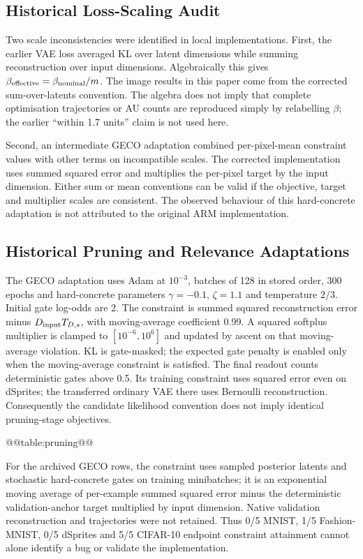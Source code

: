 \subsection{Historical Loss-Scaling Audit}\label{app:scaling}
Two scale inconsistencies were identified in local implementations.
First, the earlier VAE loss averaged KL over latent dimensions while
summing reconstruction over input dimensions. Algebraically this gives
$\beta_{\rm effective}=\beta_{\rm nominal}/m$. The image results in
this paper come from the corrected sum-over-latents convention. The
algebra does not imply that complete optimisation trajectories or AU
counts are reproduced simply by relabelling $\beta$; the earlier
``within 1.7 units'' claim is not used here.

Second, an intermediate GECO adaptation combined per-pixel-mean
constraint values with other terms on incompatible scales. The corrected
implementation uses summed squared error and multiplies the per-pixel
target by the input dimension. Either sum or mean conventions can be
valid if the objective, target and multiplier scales are consistent.
The observed behaviour of this hard-concrete adaptation is not attributed
to the original ARM implementation.

\subsection{Historical Pruning and Relevance Adaptations}\label{app:adaptations}
The GECO adaptation uses Adam at $10^{-3}$, batches of 128 in stored
order, 300 epochs and hard-concrete parameters $\gamma=-0.1$,
$\zeta=1.1$ and temperature $2/3$. Initial gate log-odds are 2. The
constraint is summed squared reconstruction error minus
$D_{\rm input}T_{D,s}$, with moving-average coefficient 0.99. A squared
softplus multiplier is clamped to $[10^{-6},10^6]$ and updated by ascent
on that moving-average violation. KL is gate-masked; the expected gate
penalty is enabled only when the moving-average constraint is satisfied.
The final readout counts deterministic gates above 0.5. Its training
constraint uses squared error even on dSprites; the transferred ordinary
VAE there uses Bernoulli reconstruction. Consequently the candidate
likelihood convention does not imply identical pruning-stage objectives.

@@table:pruning@@

For the archived GECO rows, the constraint uses sampled posterior
latents and stochastic hard-concrete gates on training minibatches;
it is an exponential moving average of per-example summed squared
error minus the deterministic validation-anchor target multiplied by
input dimension. Native validation reconstruction and trajectories
were not retained. Thus 0/5 MNIST, 1/5 Fashion-MNIST, 0/5 dSprites and
5/5 CIFAR-10 endpoint constraint attainment cannot alone identify a
bug or validate the implementation.

